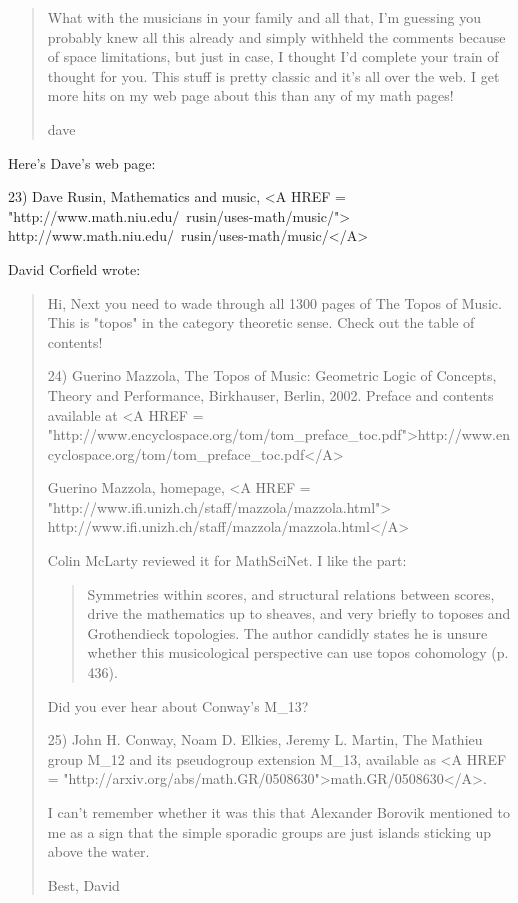 \begin{quote}
What with the musicians in your family and all that, I'm guessing
you probably knew all this already and simply withheld the
comments because of space limitations, but just in case, I thought
I'd complete your train of thought for you. This stuff is pretty
classic and it's all over the web. I get more hits on my web
page about this than any of my math pages!

dave
\end{quote}


Here's Dave's web page:

23) Dave Rusin, Mathematics and music,  
<A HREF = "http://www.math.niu.edu/~rusin/uses-math/music/">
http://www.math.niu.edu/~rusin/uses-math/music/</A>

David Corfield wrote:

\begin{quote}
Hi, 
Next you need to wade through all 1300 pages of The Topos
of Music.  This is "topos" in the category theoretic sense.
Check out the table of contents!

24) Guerino Mazzola, The Topos of Music: Geometric Logic
of Concepts, Theory and Performance, Birkhauser, Berlin, 2002.
Preface and contents available at 
<A HREF = "http://www.encyclospace.org/tom/tom_preface_toc.pdf">http://www.encyclospace.org/tom/tom_preface_toc.pdf</A>

Guerino Mazzola, homepage,
<A HREF = "http://www.ifi.unizh.ch/staff/mazzola/mazzola.html">
http://www.ifi.unizh.ch/staff/mazzola/mazzola.html</A>

Colin McLarty reviewed it for MathSciNet.  I like the part:

\begin{quote}
Symmetries within scores, and structural relations between scores, drive the 
mathematics up to sheaves, and very briefly to toposes and Grothendieck 
topologies. The author candidly states he is unsure whether this 
musicological perspective can use topos cohomology (p. 436). 
\end{quote}

Did you ever hear about Conway's M_{13}? 

25) John H. Conway, Noam D. Elkies, Jeremy L. Martin,
The Mathieu group M_{12} and its pseudogroup extension 
M_{13}, available as 
<A HREF = "http://arxiv.org/abs/math.GR/0508630">math.GR/0508630</A>.

I can't remember whether it was this that Alexander Borovik mentioned to me as 
a sign that the simple sporadic groups are just islands sticking up above the 
water.

Best, David
\end{quote}

